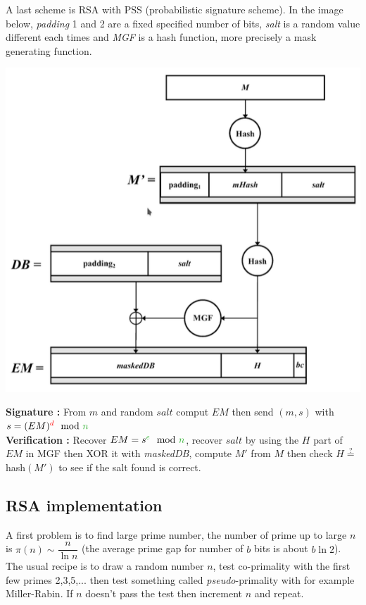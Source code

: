 \documentclass[11pt,a4paper]{report}
\begin{document}
A last scheme is RSA with PSS (probabilistic signature scheme). In the image below, \emph{padding} 1 and 2 are a fixed specified number of bits, \emph{salt} is a random value different each times and \emph{MGF} is a hash function, more precisely a mask generating function.
\begin{center}
\includegraphics[scale=0.5]{img/img34.png}
\end{center}
\textbf{Signature :} From $m$ and random $salt$ comput $EM$ then send $(m,s)$ with $s = (EM)^{\textcolor{red}{d}} \mod \textcolor{ao}{n}$\\
\textbf{Verification :} Recover $EM = s^{\textcolor{ao}{e}} \mod \textcolor{ao}{n}$, recover $salt$ by using the $H$ part of $EM$ in MGF then XOR it with \textit{maskedDB}, compute $M'$ from $M$ then check $H \stackrel{?}{=} $ hash$(M')$ to see if the salt found is correct.

\subsection{RSA implementation}
A first problem is to find large prime number, the number of prime up to large $n$ is $\pi(n) \sim \dfrac{n}{\ln n}$ (the average prime gap for number of $b$ bits is about $b \ln 2$). The usual recipe is to draw a random number $n$, test co-primality with the first few primes 2,3,5,...  then test something called \emph{pseudo}-primality with for example Miller-Rabin. If $n$ doesn't pass the test then increment $n$ and repeat.\\
\end{document}
